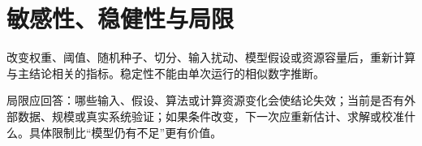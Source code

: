 \section{敏感性、稳健性与局限}

改变权重、阈值、随机种子、切分、输入扰动、模型假设或资源容量后，重新计算与主结论相关的指标。稳定性不能由单次运行的相似数字推断。

局限应回答：哪些输入、假设、算法或计算资源变化会使结论失效；当前是否有外部数据、规模或真实系统验证；如果条件改变，下一次应重新估计、求解或校准什么。具体限制比“模型仍有不足”更有价值。
